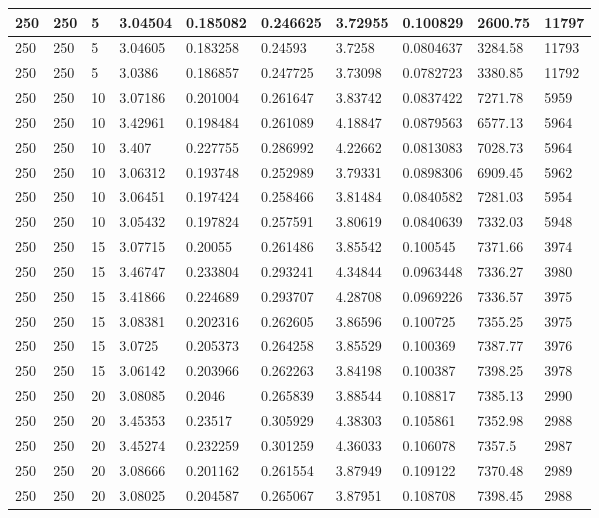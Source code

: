 \begin{landscape}
\begin{longtable}{ | l | l | l | l | l | l | l | l | l | l | }
250 & 250 & 5 & 3.04504 & 0.185082 & 0.246625 & 3.72955 & 0.100829 & 2600.75 & 11797\\ \hline
250 & 250 & 5 & 3.04605 & 0.183258 & 0.24593 & 3.7258 & 0.0804637 & 3284.58 & 11793\\ \hline
250 & 250 & 5 & 3.0386 & 0.186857 & 0.247725 & 3.73098 & 0.0782723 & 3380.85 & 11792\\ \hline
250 & 250 & 10 & 3.07186 & 0.201004 & 0.261647 & 3.83742 & 0.0837422 & 7271.78 & 5959\\ \hline
250 & 250 & 10 & 3.42961 & 0.198484 & 0.261089 & 4.18847 & 0.0879563 & 6577.13 & 5964\\ \hline
250 & 250 & 10 & 3.407 & 0.227755 & 0.286992 & 4.22662 & 0.0813083 & 7028.73 & 5964\\ \hline
250 & 250 & 10 & 3.06312 & 0.193748 & 0.252989 & 3.79331 & 0.0898306 & 6909.45 & 5962\\ \hline
250 & 250 & 10 & 3.06451 & 0.197424 & 0.258466 & 3.81484 & 0.0840582 & 7281.03 & 5954\\ \hline
250 & 250 & 10 & 3.05432 & 0.197824 & 0.257591 & 3.80619 & 0.0840639 & 7332.03 & 5948\\ \hline
250 & 250 & 15 & 3.07715 & 0.20055 & 0.261486 & 3.85542 & 0.100545 & 7371.66 & 3974\\ \hline
250 & 250 & 15 & 3.46747 & 0.233804 & 0.293241 & 4.34844 & 0.0963448 & 7336.27 & 3980\\ \hline
250 & 250 & 15 & 3.41866 & 0.224689 & 0.293707 & 4.28708 & 0.0969226 & 7336.57 & 3975\\ \hline
250 & 250 & 15 & 3.08381 & 0.202316 & 0.262605 & 3.86596 & 0.100725 & 7355.25 & 3975\\ \hline
250 & 250 & 15 & 3.0725 & 0.205373 & 0.264258 & 3.85529 & 0.100369 & 7387.77 & 3976\\ \hline
250 & 250 & 15 & 3.06142 & 0.203966 & 0.262263 & 3.84198 & 0.100387 & 7398.25 & 3978\\ \hline
250 & 250 & 20 & 3.08085 & 0.2046 & 0.265839 & 3.88544 & 0.108817 & 7385.13 & 2990\\ \hline
250 & 250 & 20 & 3.45353 & 0.23517 & 0.305929 & 4.38303 & 0.105861 & 7352.98 & 2988\\ \hline
250 & 250 & 20 & 3.45274 & 0.232259 & 0.301259 & 4.36033 & 0.106078 & 7357.5 & 2987\\ \hline
250 & 250 & 20 & 3.08666 & 0.201162 & 0.261554 & 3.87949 & 0.109122 & 7370.48 & 2989\\ \hline
250 & 250 & 20 & 3.08025 & 0.204587 & 0.265067 & 3.87951 & 0.108708 & 7398.45 & 2988\\ \hline

\end{longtable}
\end{landscape}
